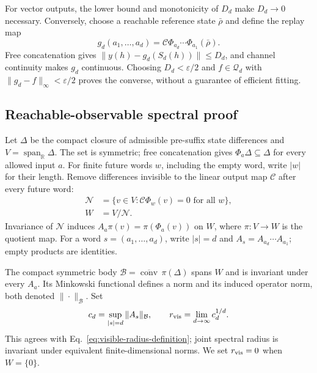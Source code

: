 For vector outputs, the lower bound and monotonicity of $D_d$ make
$D_d\to0$ necessary. Conversely, choose a reachable reference state
$\bar\rho$ and define the replay map
\begin{equation}
 g_d(a_1,\ldots,a_d)
 =\mathcal C\Phi_{a_d}\cdots\Phi_{a_1}(\bar\rho).
 \label{eq:replay-map}
\end{equation}
Free concatenation gives $\|y(h)-g_d(S_d(h))\|\leq D_d$, and channel
continuity makes $g_d$ continuous. Choosing $D_d<\varepsilon/2$ and
$f\in\mathcal Q_d$ with $\|g_d-f\|_\infty<\varepsilon/2$ proves the converse,
without a guarantee of efficient fitting.

\subsection{Reachable-observable spectral proof}
\label{app:observable-proof}

Let $\Delta$ be the compact closure of admissible pre-suffix state
differences and $V=\operatorname{span}_{\mathbb R}\Delta$.
The set is symmetric; free concatenation gives
$\Phi_a\Delta\subseteq\Delta$ for every allowed input $a$.
For finite future words $w$, including the empty word, write $|w|$ for
their length. Remove differences invisible to the linear output map
$\mathcal C$ after every future word:
\begin{equation}
 \begin{aligned}
 \mathcal N&=\{v\in V:\mathcal C\Phi_w(v)=0
 \text{ for all }w\},\\
 W&=V/\mathcal N .
 \end{aligned}
 \label{eq:visible-quotient}
\end{equation}
Invariance of $\mathcal N$ induces $A_a\pi(v)=\pi(\Phi_a(v))$ on $W$,
where $\pi:V\to W$ is the quotient map. For a word $s=(a_1,\ldots,a_d)$,
write $|s|=d$ and $A_s=A_{a_d}\cdots A_{a_1}$; empty products are identities.

The compact symmetric body
$\mathcal B=\overline{\operatorname{conv}}\,\pi(\Delta)$
spans $W$ and is invariant under every $A_a$. Its Minkowski functional
defines a norm and its induced operator norm, both denoted
$\|\cdot\|_{\mathcal B}$. Set
\begin{equation}
 c_d=\sup_{|s|=d}\|A_s\|_{\mathcal B},
 \qquad r_{\rm vis}=\lim_{d\to\infty}c_d^{1/d}.
 \label{eq:visible-radius-formal}
\end{equation}
This agrees with Eq.~\eqref{eq:visible-radius-definition}; joint spectral
radius is invariant under equivalent finite-dimensional norms.  We set
$r_{\rm vis}=0$ when $W=\{0\}$.

